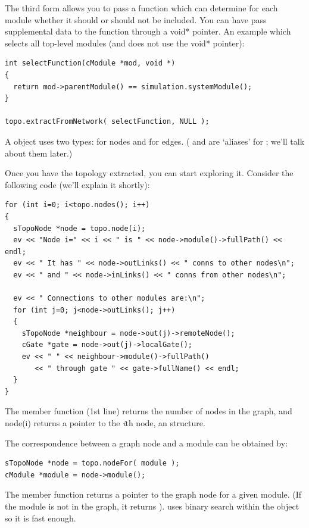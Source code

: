 The third form allows you to pass a function which can determine for
each module whether it should or should not be included.  You can have
 pass supplemental data to the function through a
void* pointer. An example which selects all top-level modules (and
does not use the void* pointer):

\begin{verbatim}
int selectFunction(cModule *mod, void *)
{
  return mod->parentModule() == simulation.systemModule();
}

topo.extractFromNetwork( selectFunction, NULL );
\end{verbatim}

%
%

A  object uses two types:  for
nodes and  for edges. ( and
 are `aliases' for ; we'll
talk about them later.)

Once you have the topology extracted, you can start exploring
it. Consider the following code (we'll explain it shortly):

\begin{verbatim}
for (int i=0; i<topo.nodes(); i++)
{
  sTopoNode *node = topo.node(i);
  ev << "Node i=" << i << " is " << node->module()->fullPath() << endl;
  ev << " It has " << node->outLinks() << " conns to other nodes\n";
  ev << " and " << node->inLinks() << " conns from other nodes\n";

  ev << " Connections to other modules are:\n";
  for (int j=0; j<node->outLinks(); j++)
  {
    sTopoNode *neighbour = node->out(j)->remoteNode();
    cGate *gate = node->out(j)->localGate();
    ev << " " << neighbour->module()->fullPath()
       << " through gate " << gate->fullName() << endl;
  }
}
\end{verbatim}

The  member function (1st line) returns the number of
nodes in the graph, and node(i) returns a pointer to the \textit{i}th
node, an  structure.


The correspondence between a graph node and a module can be obtained
by:

\begin{verbatim}
sTopoNode *node = topo.nodeFor( module );
cModule *module = node->module();
\end{verbatim}


The  member function returns a pointer to the graph
node for a given module. (If the module is not in the graph, it
returns ).  uses binary search within the
 object so it is fast enough.



